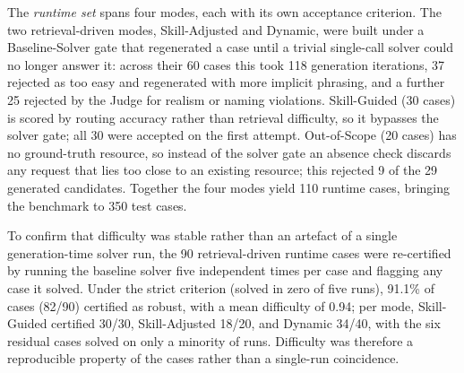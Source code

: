 \documentclass[10pt,twocolumn]{article}
\begin{document}
The \emph{runtime set} spans four modes, each with its own acceptance criterion. The two retrieval-driven modes, Skill-Adjusted and Dynamic, were built under a Baseline-Solver gate that regenerated a case until a trivial single-call solver could no longer answer it: across their 60 cases this took 118 generation iterations, 37 rejected as too easy and regenerated with more implicit phrasing, and a further 25 rejected by the Judge for realism or naming violations. Skill-Guided (30 cases) is scored by routing accuracy rather than retrieval difficulty, so it bypasses the solver gate; all 30 were accepted on the first attempt. Out-of-Scope (20 cases) has no ground-truth resource, so instead of the solver gate an absence check discards any request that lies too close to an existing resource; this rejected 9 of the 29 generated candidates. Together the four modes yield 110 runtime cases, bringing the benchmark to 350 test cases.

To confirm that difficulty was stable rather than an artefact of a single generation-time solver run, the 90 retrieval-driven runtime cases were re-certified by running the baseline solver five independent times per case and flagging any case it solved. Under the strict criterion (solved in zero of five runs), 91.1\% of cases (82/90) certified as robust, with a mean difficulty of 0.94; per mode, Skill-Guided certified 30/30, Skill-Adjusted 18/20, and Dynamic 34/40, with the six residual cases solved on only a minority of runs. Difficulty was therefore a reproducible property of the cases rather than a single-run coincidence.
\end{document}
